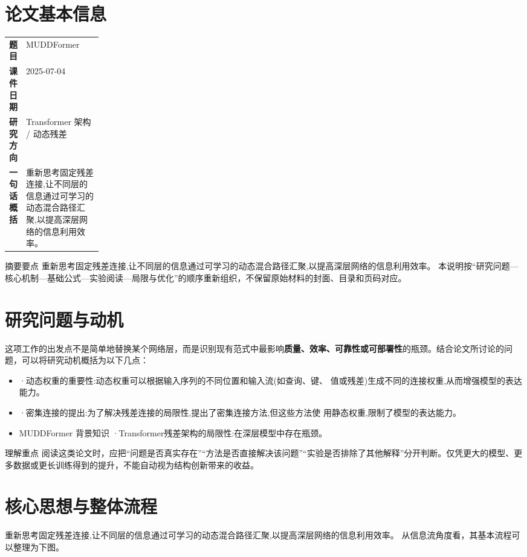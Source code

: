 \documentclass[UTF8,11pt,a4paper]{ctexart}
\newcommand{\term}[1]{\textbf{\textcolor{mainblue}{#1}}}
\begin{document}
\section{论文基本信息}
\begin{center}
\begin{tabularx}{0.94\linewidth}{>{\bfseries}p{0.18\linewidth}X}
\toprule
题目 & MUDDFormer\\
课件日期 & 2025-07-04\\
研究方向 & Transformer 架构 / 动态残差\\
一句话概括 & 重新思考固定残差连接,让不同层的信息通过可学习的动态混合路径汇聚,以提高深层网络的信息利用效率。\\
\bottomrule
\end{tabularx}
\end{center}

\begin{infobox}{摘要要点}
重新思考固定残差连接,让不同层的信息通过可学习的动态混合路径汇聚,以提高深层网络的信息利用效率。 本说明按“研究问题—核心机制—基础公式—实验阅读—局限与优化”的顺序重新组织，不保留原始材料的封面、目录和页码对应。
\end{infobox}

\section{研究问题与动机}
这项工作的出发点不是简单地替换某个网络层，而是识别现有范式中最影响\term{质量、效率、可靠性或可部署性}的瓶颈。结合论文所讨论的问题，可以将研究动机概括为以下几点：
\begin{itemize}
\item ·动态权重的重要性:动态权重可以根据输入序列的不同位置和输入流(如查询、键、 值或残差)生成不同的连接权重,从而增强模型的表达能力。
\item ·密集连接的提出:为了解决残差连接的局限性,提出了密集连接方法,但这些方法使 用静态权重,限制了模型的表达能力。
\item MUDDFormer 背景知识 ·Transformer残差架构的局限性:在深层模型中存在瓶颈。
\end{itemize}

\begin{notebox}{理解重点}
阅读这类论文时，应把“问题是否真实存在”“方法是否直接解决该问题”“实验是否排除了其他解释”分开判断。仅凭更大的模型、更多数据或更长训练得到的提升，不能自动视为结构创新带来的收益。
\end{notebox}

\section{核心思想与整体流程}
重新思考固定残差连接,让不同层的信息通过可学习的动态混合路径汇聚,以提高深层网络的信息利用效率。 从信息流角度看，其基本流程可以整理为下图。
\end{document}
